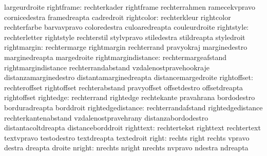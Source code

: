                            largeurdroite
               rightframe: rechterkader              rightframe
                           rechterrahmen             ramecekvpravo
                           cornicedestra             framedreapta
                           cadredroit
               rightcolor: rechterkleur              rightcolor
                           rechterfarbe              barvavpravo
                           coloredestra              culoaredreapta
                           couleurdroite
               rightstyle: rechterletter             rightstyle
                           rechterstil               stylvpravo
                           stiledestra               stildreapta
                           styledroit
              rightmargin: rechtermarge              rightmargin
                           rechterrand               pravyokraj
                           marginedestro             marginedreapta
                           margedroite
      rightmargindistance: rechtermargeafstand       rightmargindistance
                           rechterrandabstand        vzdalenostpravehookraje
                           distanzamarginedestro     distantamarginedreapta
                           distancemargedroite
              rightoffset: rechteroffset             rightoffset
                           rechterabstand            pravyoffset
                           offsetdestro              offsetdreapta
                           rightoffset
                rightedge: rechterrand               rightedge
                           rechtekante               pravahrana
                           bordodestro               borduradreapta
                           borddroit
        rightedgedistance: rechterrandafstand        rightedgedistance
                           rechterkantenabstand      vzdalenostpravehrany
                           distanzabordodestro       distantacoltdreapta
                           distanceborddroit
                righttext: rechtertekst              righttext
                           rechtertext               textvpravo
                           testodestro               textdreapta
                           textedroit
                    right: rechts                    right
                           rechts                    vpravo
                           destra                    dreapta
                           droite
                   nright: nrechts                   nright
                           nrechts                   nvpravo
                           ndestra                   ndreapta
